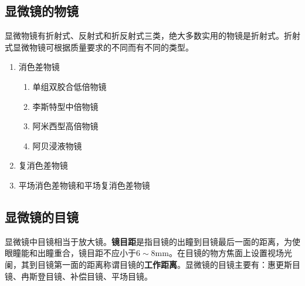 \documentclass[cn,10pt,chinesefont=founder,math=mtpro2,cite=super,toc=onecol,twoside,openany]{elegantbook}
\begin{document}
\subsection{显微镜的物镜}

显微物镜有折射式、反射式和折反射式三类，绝大多数实用的物镜是折射式。折射式显微物镜可根据质量要求的不同而有不同的类型。
\begin{enumerate}
	\item 消色差物镜
	\begin{enumerate}
		\item 单组双胶合低倍物镜
		\item 李斯特型中倍物镜
		\item 阿米西型高倍物镜
		\item 阿贝浸液物镜
	\end{enumerate}
	\item 复消色差物镜
	\item 平场消色差物镜和平场复消色差物镜
\end{enumerate}

\subsection{显微镜的目镜}
显微镜中目镜相当于放大镜。\textbf{镜目距}是指目镜的出瞳到目镜最后一面的距离，为使眼瞳能和出瞳重合，镜目距不应小于$6\sim8\mathrm{mm}$。在目镜的物方焦面上设置视场光阑，其到目镜第一面的距离称谓目镜的\textbf{工作距离}。显微镜的目镜主要有：惠更斯目镜、冉斯登目镜、补偿目镜、平场目镜。
\end{document}
